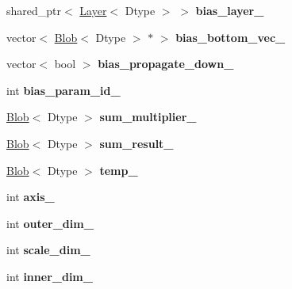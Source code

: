 \begin{DoxyCompactItemize}
\item 
\mbox{\label{classcaffe_1_1_scale_layer_ad38dbbd67383f0278dbb68d28594ae9a}} 
shared\+\_\+ptr$<$ \mbox{\hyperlink{classcaffe_1_1_layer}{Layer}}$<$ Dtype $>$ $>$ {\bfseries bias\+\_\+layer\+\_\+}
\item 
\mbox{\label{classcaffe_1_1_scale_layer_ad2f3264882f83657d23c1edd22044445}} 
vector$<$ \mbox{\hyperlink{classcaffe_1_1_blob}{Blob}}$<$ Dtype $>$ $\ast$ $>$ {\bfseries bias\+\_\+bottom\+\_\+vec\+\_\+}
\item 
\mbox{\label{classcaffe_1_1_scale_layer_a9b3eff4668f574442c291ead4673f61a}} 
vector$<$ bool $>$ {\bfseries bias\+\_\+propagate\+\_\+down\+\_\+}
\item 
\mbox{\label{classcaffe_1_1_scale_layer_a70bdc932e2025afa58c392775db49fb7}} 
int {\bfseries bias\+\_\+param\+\_\+id\+\_\+}
\item 
\mbox{\label{classcaffe_1_1_scale_layer_a0821a0186dcea609cf20910e39ac7211}} 
\mbox{\hyperlink{classcaffe_1_1_blob}{Blob}}$<$ Dtype $>$ {\bfseries sum\+\_\+multiplier\+\_\+}
\item 
\mbox{\label{classcaffe_1_1_scale_layer_a00fe7accc4d7bbc549d32c0990f0f3a6}} 
\mbox{\hyperlink{classcaffe_1_1_blob}{Blob}}$<$ Dtype $>$ {\bfseries sum\+\_\+result\+\_\+}
\item 
\mbox{\label{classcaffe_1_1_scale_layer_aa850d24af2fc59b25ebfc4e966737701}} 
\mbox{\hyperlink{classcaffe_1_1_blob}{Blob}}$<$ Dtype $>$ {\bfseries temp\+\_\+}
\item 
\mbox{\label{classcaffe_1_1_scale_layer_a33d30568baa3ffc9c6df16af3860a6c1}} 
int {\bfseries axis\+\_\+}
\item 
\mbox{\label{classcaffe_1_1_scale_layer_af3223b2bc4366a3d38196eb2cf401fa6}} 
int {\bfseries outer\+\_\+dim\+\_\+}
\item 
\mbox{\label{classcaffe_1_1_scale_layer_a14db4d33558664c8b31d6c285f0126e6}} 
int {\bfseries scale\+\_\+dim\+\_\+}
\item 
\mbox{\label{classcaffe_1_1_scale_layer_a4cce3a226cd6e41c6a8a5c9a6162170f}} 
int {\bfseries inner\+\_\+dim\+\_\+}
\end{DoxyCompactItemize}


